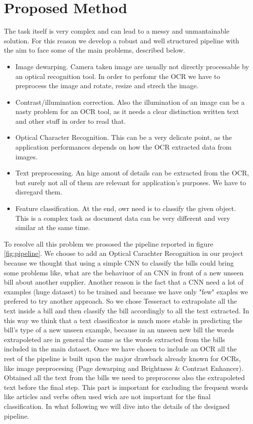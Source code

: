 \documentclass[10pt,twocolumn,letterpaper]{article}
\begin{document}
\section{Proposed Method}
\label{sec:proposed-method}

The task itself is very complex and can lead to a messy and
unmantainable solution. For this reason we develop a robust and well
structured pipeline with the aim to face some of the main problems,
described below.

\begin{itemize}
  \item Image dewarping. Camera taken image are usually not directly
    processable by an optical recognition tool. In order to perfomr
    the OCR we have to preprocess the image and rotate, resize and
    strech the image.
  \item Contrast/illumination correction. Also the illumination of an
    image can be a nasty problem for an OCR tool, as it needs a clear
    distinction written text and other stuff in order to read that.
  \item Optical Character Recognition. This can be a very delicate
    point, as the application performances depends on how the OCR
    extracted data from images.
  \item Text preprocessing. An hige amout of details can be extracted
    from the OCR, but surely not all of them are relevant for
    application's purposes. We have to disregard them.
  \item Feature classification. At the end, owr need is to classify
    the given object. This is a complex task as document data can be
    very different and very similar at the same time.
\end{itemize}

To resolve all this problem we prososed the pipeline reported in
figure \ref{fig:pipeline}. We choose to add an Optical Carachter
Recognition in our project because we thought that using a simple CNN
to classify the bills could bring some problems like, what are the
behaviuor of an CNN in front of a new unseen bill about another
supplier. Another reason is the fact that a CNN need a lot of examples
(huge dataset) to be trained and because we have only "few" exaples we
prefered to try another approach. So we chose Tesseract to extrapolate
all the text inside a bill and then classify the bill accordingly to
all the text extracted. In this way we think that a text classificator
is much more stable in predicting the bill's type of a new unseen
example, because in an unseen new bill the words extrapoleted are in
general the same as the words extracted from the bills included in the
main dataset. Once we have chosen to include an OCR all the rest of
the pipeline is built upon the major drawback already known for OCRs,
like image preprocesing (Page dewarping and Brightness \& Contrast
Enhancer). Obtained all the text from the bills we need to preproccess
also the extrapoleted text before the final step. This part is
important for excluding the frequent words like articles and verbs
often used wich are not important for the final classification. In
what following we will dive into the details of the designed pipeline.
\end{document}
